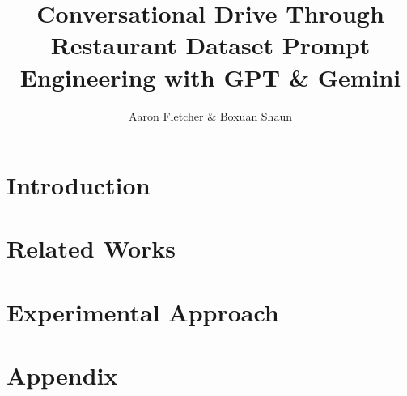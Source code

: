 \documentclass{article}
\title{Conversational Drive Through Restaurant Dataset\: Prompt Engineering with GPT \& Gemini}
\author{Aaron Fletcher \& Boxuan Shaun}
\begin{document}
\maketitle
\section{Introduction}

\newpage
\section{Related Works}

\newpage
\section{Experimental Approach}


\newpage


\appendix
\section{Appendix}
\end{document}

